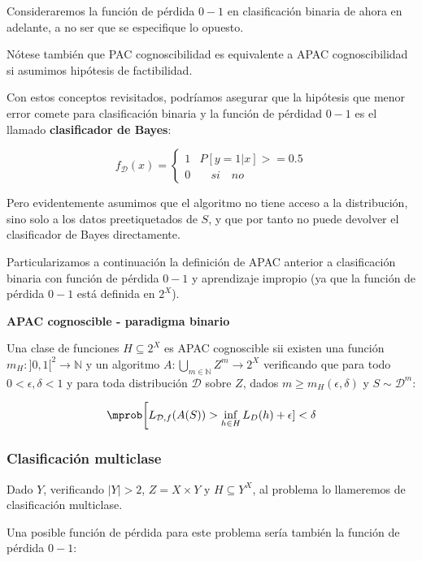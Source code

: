 Consideraremos la función de pérdida $0-1$ en clasificación binaria de ahora en adelante, a no ser que se especifique
lo opuesto.

Nótese también que PAC cognoscibilidad es equivalente a APAC cognoscibilidad si asumimos hipótesis 
de factibilidad.

Con estos conceptos revisitados, podríamos asegurar que la hipótesis que menor error comete para 
clasificación binaria y la función de pérdidad $0-1$ es el llamado \textbf{clasificador de Bayes}:

\[f_{\mathcal{D}}(x) = \left\{\begin{array}{ll}
1 & P [y = 1 |x] >= 0.5\\
0 & \quad si \quad no
\end{array}\right.\]

Pero evidentemente asumimos que el algoritmo no tiene acceso a la distribución, sino solo a los datos 
preetiquetados de $S$, y que por tanto no puede devolver el clasificador de Bayes directamente.

Particularizamos a continuación la definición de APAC anterior a clasificación binaria
con función de pérdida $0-1$ y aprendizaje impropio (ya que la función de pérdida $0-1$ está definida 
en $2^X$).

\begin{definition*} \textbf{APAC cognoscible - paradigma binario}

Una clase de funciones $H \subseteq 2^X$ es APAC cognoscible sii existen una función 
$m_{H} : ]0,1[^2\rightarrow \mathbb{N}$ y un algoritmo $A: \underset{m\in \mathbb{N}}{\bigcup} Z^m \rightarrow 2^X$ verificando que para todo
$0 < \epsilon, \delta < 1$ y para toda distribución $\mathcal{D}$ sobre $Z$, dados 
$m \ge m_H(\epsilon, \delta)$ y $S\sim \mathcal{D}^m$:

\[\mprob \bigg[L_{\mathcal{D},f}(A(S)) > \inf_{h\in H} L_D(h) + \epsilon] < \delta\]
\end{definition*}

\subsubsection{Clasificación multiclase}

Dado $Y$, verificando $|Y| > 2$, $Z=X\times Y$ y $H\subseteq Y^X$, al problema lo llameremos de 
clasificación multiclase. 

Una posible función de pérdida para este problema sería también la función de pérdida $0-1$:

